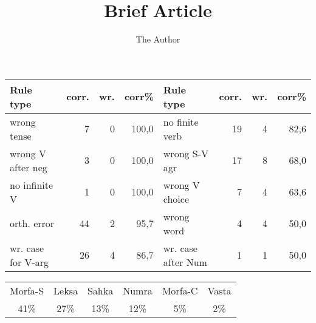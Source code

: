 \documentclass[11pt]{article}
\title{Brief Article}
\author{The Author}
\begin{document}
\maketitle


\begin{table}[htdp]
\begin{center}
\begin{tabular}{|l|r|r|r|l|r|r|r|}
\hline
Rule type  & corr. & wr. & corr\%    & Rule type & corr. & wr. & corr\%     \\
\hline
wrong tense  & 7 & 0 & 100,0	   & no finite verb  & 19 & 4 & 82,6	  \\
wrong V after neg  & 3 & 0 & 100,0 & wrong S-V agr  & 17 & 8 & 68,0	  \\
no infinite V  & 1 & 0 & 100,0	   & wrong V choice  & 7 & 4 & 63,6	  \\
orth. error  & 44 & 2 & 95,7	   & wrong word  & 4 & 4 & 50,0		  \\
wr. case for V-arg & 26 & 4 & 86,7 & wr. case after Num & 1 & 1 & 50,0 \\
\hline
\end{tabular}
\end{center}
\label{default}
\end{table}%



\begin{table}[htdp]
\begin{center}
\begin{tabular}{|c|c|c|c|c|c|}
\hline
Morfa-S & Leksa & Sahka & Numra & Morfa-C & Vasta \\
41\% & 27\% & 13\% & 12\% & 5\% & 2\% \\
\hline
\end{tabular}
\end{center}
\label{default}
\end{table}%
\end{document}
